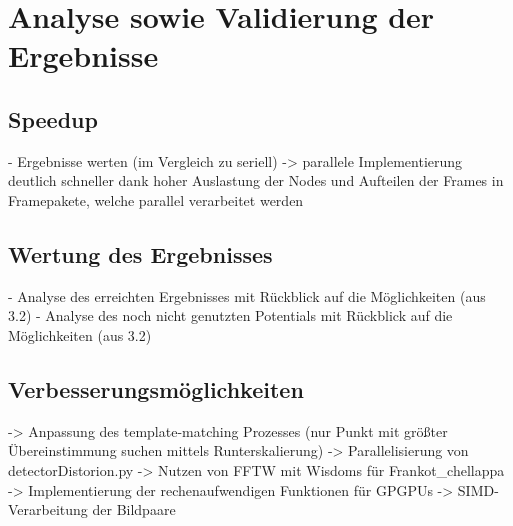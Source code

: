 \chapter{Analyse sowie Validierung der Ergebnisse}

\section{Speedup}

\begin{correctmore}
	- Ergebnisse werten (im Vergleich zu seriell)
	-> parallele Implementierung deutlich schneller dank hoher Auslastung der Nodes und Aufteilen der Frames in Framepakete, welche parallel verarbeitet werden
\end{correctmore}
\section{Wertung des Ergebnisses}

\begin{correctmore}
	- Analyse des erreichten Ergebnisses mit Rückblick auf die Möglichkeiten (aus 3.2)
	- Analyse des noch nicht genutzten Potentials mit Rückblick auf die Möglichkeiten (aus 3.2)
\end{correctmore}

\section{Verbesserungsmöglichkeiten}

\begin{correctmore}
	-> Anpassung des template-matching Prozesses (nur Punkt mit größter Übereinstimmung suchen mittels Runterskalierung)
	-> Parallelisierung von detectorDistorion.py
	-> Nutzen von FFTW mit Wisdoms für Frankot\_chellappa
	-> Implementierung der rechenaufwendigen Funktionen für GPGPUs
	-> SIMD-Verarbeitung der Bildpaare
\end{correctmore}